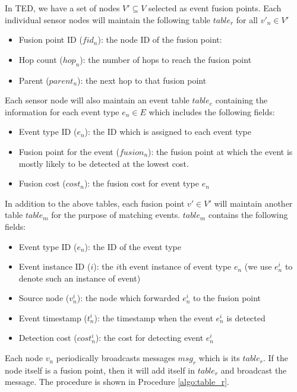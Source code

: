 In TED, we have a set of nodes \(V'\subseteq V\) selected as event fusion points. Each individual sensor nodes will maintain the following table \(table_r\) for all \(v'_n\in V'\)
\begin{itemize}
\item Fusion point ID (\(fid_n\)): the node ID of the fusion point:
\item	Hop count (\(hop_n\)): the number of hops to reach the fusion point
\item	Parent (\(parent_n\)): the next hop to that fusion point\\
\end{itemize}
Each sensor node will also maintain an event table \(table_e\) containing the information for each event type \(e_n\in E\) which includes the following fields:
\begin{itemize}
\item Event type ID (\(e_n\)): the ID which is assigned to each event type
\item Fusion point for the event (\(fusion_n\)): the fusion point at which the event is mostly likely to be detected at the lowest cost.
\item Fusion cost (\(cost_n\)): the fusion cost for event type \(e_n\)\\
\end{itemize}
In addition to the above tables, each fusion point \(v'\in V'\) will maintain another table \(table_m\) for the purpose of matching events. \(table_m\) contains the following fields:
\begin{itemize}
\item Event type ID (\(e_n\)): the ID of the event type
\item Event instance ID (\(i\)): the \(i\)th event instance of event type \(e_n\) (we use \(e_n^i\) to denote such an instance of event)
\item Source node (\(v_n^i\)): the node which forwarded \(e_n^i\) to the fusion point
\item Event timestamp (\(t_n^i\)): the timestamp when the event \(e_n^i\) is detected
\item Detection cost (\(cost_n^i\)): the cost for detecting event \(e_n^i\)
\end{itemize}

Each node \(v_n\) periodically broadcasts messages \(msg_r\) which is its \(table_r\). If the node itself is a fusion point, then it will add itself in \(table_r\) and broadcast the message. The procedure is shown in Procedure \ref{algo:table_r}.

